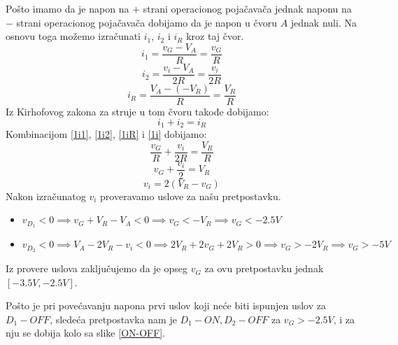 \documentclass{article}
\begin{document}
\begin{enumerate}[itemsep=\baselineskip]
        Pošto imamo da je napon na $+$ strani operacionog pojačavača jednak naponu na $-$ strani operacionog pojačavača dobijamo da je napon u čvoru $A$ jednak nuli. Na osnovu toga možemo izračunati $i_1$, $i_2$ i $i_R$ kroz taj čvor.
        \begin{equation}
            \label{1i1}
            i_1 = \frac{v_G - V_A}{R} = \frac{v_G}{R}
        \end{equation}
        \begin{equation}
            \label{1i2}
            i_2 = \frac{v_i - V_A}{2R} = \frac{v_i}{2R}
        \end{equation}
        \begin{equation}
            \label{1iR}
            i_R = \frac{V_A - (-V_R)}{R} = \frac{V_R}{R}
        \end{equation}
        Iz Kirhofovog zakona za struje u tom čvoru takođe dobijamo:
        \begin{equation}
            \label{1i}
            i_1 + i_2 = i_R
        \end{equation}
        Kombinacijom \eqref{1i1}, \eqref{1i2}, \eqref{1iR} i \eqref{1i} dobijamo:
        $$\frac{v_G}{R} + \frac{v_i}{2R} = \frac{V_R}{R}$$
        $$v_G + \frac{v_i}{2} = V_R$$
        \begin{equation}
            \label{1vi}
            \boxed{v_i = 2(V_R - v_G)}
        \end{equation}
        Nakon izračunatog $v_i$ proveravamo uslove za našu pretpostavku.
        \begin{itemize}
            \item $v_{D_1} < 0 \implies v_G + V_R - V_A < 0 \implies v_G < -V_R \implies v_G < -2.5V$
            \item $v_{D_2} < 0 \implies V_A - 2V_R - v_i < 0 \implies 2V_R + 2v_G + 2V_R > 0 \implies v_G > -2V_R \implies v_G > -5V$
        \end{itemize}
        Iz provere uslova zaključujemo da je opseg $v_G$ za ovu pretpostavku jednak $[-3.5V, -2.5V]$.

        Pošto je pri povećavanju napona prvi uslov koji neće biti ispunjen uslov za $D_1-OFF$, sledeća pretpostavka nam je $D_1-ON, D_2-OFF$ za $v_G > -2.5V$, i za nju se dobija kolo sa slike \ref{ON-OFF}.


\end{enumerate}
\end{document}
